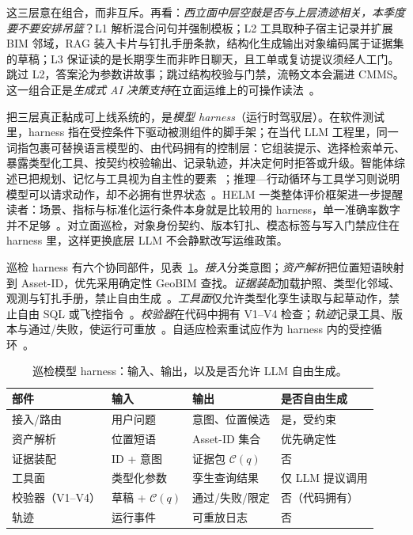 这三层意在组合，而非互斥。再看：\emph{西立面中层空鼓是否与上层渍迹相关，本季度要不要安排吊篮}？L1 解析混合问句并强制模板；L2 工具取种子宿主记录并扩展 BIM 邻域，RAG 装入卡片与钉扎手册条款，结构化生成输出对象编码属于证据集的草稿；L3 保证读的是长期孪生而非昨日聊天，且工单或复访提议须经人工门。跳过 L2，答案沦为参数讲故事；跳过结构校验与门禁，流畅文本会漏进 CMMS。这一组合正是\emph{生成式 AI 决策支持}在立面运维上的可操作读法~\cite{lewis2020,yao2023react,ji2023}。

把三层真正黏成可上线系统的，是\emph{模型 harness}（运行时驾驭层）。在软件测试里，harness 指在受控条件下驱动被测组件的脚手架；在当代 LLM 工程里，同一词指包裹可替换语言模型的、由代码拥有的控制层：它组装提示、选择检索单元、暴露类型化工具、按契约校验输出、记录轨迹，并决定何时拒答或升级。智能体综述已把规划、记忆与工具视为自主性的要素~\cite{wang2024surveyagents,li2024surveymultiagent}；推理—行动循环与工具学习则说明模型可以请求动作，却不必拥有世界状态~\cite{yao2023react,schick2023toolformer}。HELM 一类整体评价框架进一步提醒读者：场景、指标与标准化运行条件本身就是比较用的 harness，单一准确率数字并不足够~\cite{liang2023helm}。对立面巡检，对象身份契约、版本钉扎、模态标签与写入门禁应住在 harness 里，这样更换底层 LLM 不会静默改写运维政策。

巡检 harness 有六个协同部件，见表~\ref{tab:ch8-harness}。\emph{接入}分类意图；\emph{资产解析}把位置短语映射到 Asset-ID，优先采用确定性 GeoBIM 查找。\emph{证据装配}加载护照、类型化邻域、观测与钉扎手册，禁止自由生成~\cite{lewis2020,peng2024}。\emph{工具面}仅允许类型化孪生读取与起草动作，禁止自由 SQL 或飞控指令~\cite{gao2026ifcagent,luo2025llmdtrobot}。\emph{校验器}在代码中拥有 V1--V4 检查；\emph{轨迹}记录工具、版本与通过/失败，使运行可重放~\cite{ji2023,liang2023helm}。自适应检索重试应作为 harness 内的受控循环~\cite{asai2024selfrag,jeong2024adaptive}。

\begin{table}[htbp]
\centering
\caption{巡检模型 harness：输入、输出，以及是否允许 LLM 自由生成。}
\label{tab:ch8-harness}
\begin{tabular}{lllp{2.6cm}}
\toprule
部件 & 输入 & 输出 & 是否自由生成 \\
\midrule
接入/路由 & 用户问题 & 意图、位置候选 & 是，受约束 \\
资产解析 & 位置短语 & Asset-ID 集合 & 优先确定性 \\
证据装配 & ID + 意图 & 证据包 $\mathcal{C}(q)$ & 否 \\
工具面 & 类型化参数 & 孪生查询结果 & 仅 LLM 提议调用 \\
校验器（V1--V4） & 草稿 + $\mathcal{C}(q)$ & 通过/失败/限定 & 否（代码拥有） \\
轨迹 & 运行事件 & 可重放日志 & 否 \\
\bottomrule
\end{tabular}
\end{table}

